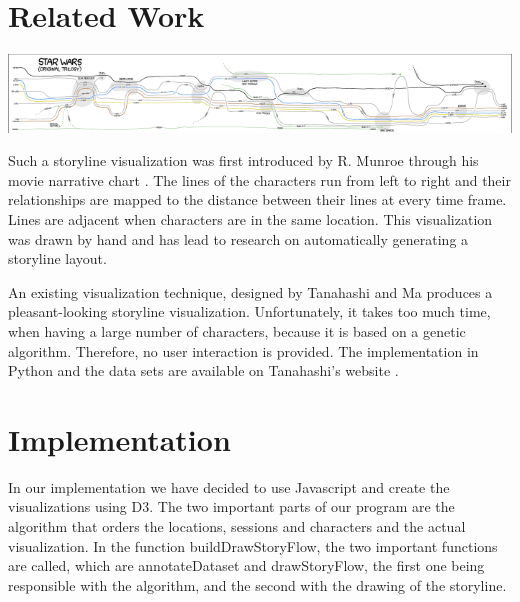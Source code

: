 \documentclass{report}
\begin{document}
\chapter{Related Work}
\centerline{\includegraphics{movie_narrative_chart_star_wars_resized}}
\par
Such a storyline visualization was first introduced by R. Munroe through his movie narrative chart \cite{xkcd}. The lines of the characters run from left to right and their relationships are mapped to the distance between their lines at every time frame. Lines are adjacent when characters are in the same location. This visualization was drawn by hand and has lead to research on automatically generating a storyline layout.
\par
An existing visualization technique, designed by Tanahashi and Ma \cite{tanahashi} produces a pleasant-looking storyline visualization. Unfortunately, it takes too much time, when having a large number of characters, because it is based on a genetic algorithm. Therefore, no user interaction is provided. The implementation in Python and the data sets are available on Tanahashi's website \cite{website:tanahashi}.

\chapter{Implementation}
\par
In our implementation we have decided to use Javascript and create the visualizations using D3. The two important parts of our program are the algorithm that orders the locations, sessions and characters and the actual visualization. In the function buildDrawStoryFlow, the two important functions are called, which are annotateDataset and drawStoryFlow, the first one being responsible with the algorithm, and the second with the drawing of the storyline.
\end{document}
